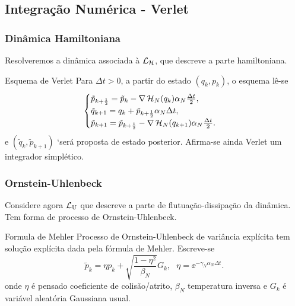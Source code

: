 \subsection{Integração Numérica - Verlet}
\begin{frame}
	\frametitle{Dinâmica Hamiltoniana}
	Resolveremos a dinâmica associada à $\operatorname{\mathcal{L}}_{\operatorname{\mathcal{H}}}$, que descreve a parte hamiltoniana.
	
	\pause
	
	\vspace{0.6cm}
	\begin{block}{Esquema de Verlet}
		Para $\Delta t > 0$, a partir do estado $(q_k, p_k)$, o esquema lê-se
		\[
		\begin{cases}
			\tilde{p}_{k+\frac{1}{2}} = \tilde{p}_k - \nabla \operatorname{\mathcal{H}}_N(q_k) \alpha_N \frac{\Delta t}{2}, \\
			\tilde{q}_{k+1} = q_k + \tilde{p}_{k + \frac{1}{2}} \alpha_N \Delta t, \\
			\tilde{p}_{k+1} = \tilde{p}_{k+\frac{1}{2}} - \nabla \operatorname{\mathcal{H}}_N(q_{k+1}) \alpha_N \frac{\Delta t}{2}.
		\end{cases}
		\]
		e $(\tilde{q}_{k}, \tilde{p}_{k+1})$ `será proposta de estado posterior. Afirma-se ainda Verlet um integrador simplético.
	\end{block}
\end{frame}
\begin{frame}
	\frametitle{Ornstein-Uhlenbeck}
	Considere agora $\operatorname{\mathcal{L}}_{\operatorname{U}}$ que descreve a parte de flutuação-dissipação da dinâmica. Tem forma de processo de Ornstein-Uhlenbeck.
	
	\pause
	
	\vspace{0.6cm}
	\begin{block}{Formula de Mehler}
		Processo de Ornstein-Uhlenbeck de variância explícita tem solução explícita dada pela fórmula de Mehler. Escreve-se
		\[
			\tilde{p}_k = \eta p_k + \sqrt{\frac{1-\eta^2}{\beta_N}} G_k, \ \ \ \eta = \ee^{-\gamma_N \alpha_N \Delta t}.
		\]
		onde $\eta$ é pensado coeficiente de colisão/atrito, $\beta_N$ temperatura inversa e $G_k$ é variável aleatória Gaussiana usual.
	\end{block}
\end{frame}

